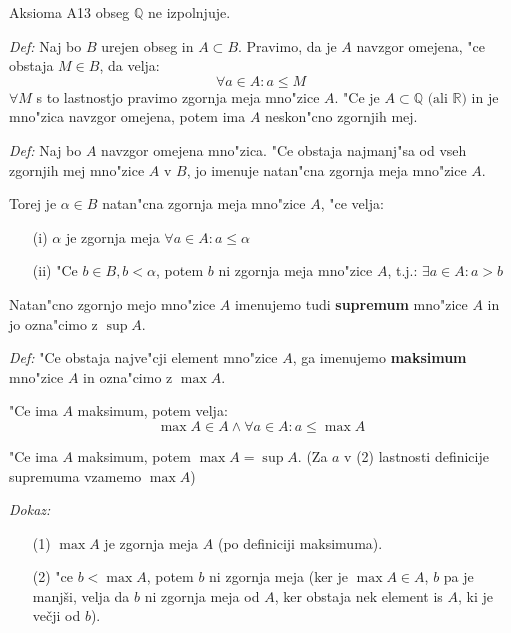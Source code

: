 Aksioma A13 obseg $\mathbb{Q}$ ne izpolnjuje.

\emph{Def:} Naj bo $B$ urejen obseg in $A \subset B$. Pravimo, da je $A$ navzgor omejena, "ce obstaja $M \in B$, da velja:
\[\forall a \in A: a \leq M\]
$\forall M$ s to lastnostjo pravimo zgornja meja mno"zice $A$. "Ce je $A \subset \mathbb{Q} \text{ (ali } \mathbb{R})$ in je mno"zica navzgor omejena, potem ima $A$ neskon"cno zgornjih mej.

\emph{Def:} Naj bo $A$ navzgor omejena mno"zica. "Ce obstaja najmanj"sa od vseh zgornjih mej mno"zice $A$ v $B$, jo imenuje natan"cna zgornja meja mno"zice $A$.

Torej je $\alpha \in B$ natan"cna zgornja meja mno"zice $A$, "ce velja:
\begin{itemize}
	\item[(i)] $\alpha$ je zgornja meja $\forall a \in A: a \leq \alpha$
	\item[(ii)] "Ce $b \in B, b < \alpha$, potem $b$ ni zgornja meja mno"zice $A$, t.j.: $\exists a \in A: a > b$
\end{itemize}
Natan"cno zgornjo mejo mno"zice $A$ imenujemo tudi \textbf{supremum} mno"zice $A$ in jo ozna"cimo z $\sup A$.

\emph{Def:} "Ce obstaja najve"cji element mno"zice $A$, ga imenujemo \textbf{maksimum} mno"zice $A$ in ozna"cimo z $\max A$.

"Ce ima $A$ maksimum, potem velja:
\[\max A \in A \land \forall a \in A: a \leq \max A\]

"Ce ima $A$ maksimum, potem $\max A = \sup A$. (Za $a$ v (2) lastnosti definicije supremuma vzamemo $\max A$)

\emph{Dokaz:}
\begin{itemize}
	\item[(1)] $\max A$ je zgornja meja $A$ (po definiciji maksimuma).
	\item[(2)] "ce $b < \max A$, potem $b$ ni zgornja meja (ker je $\max A \in A$, $b$ pa je manjši, velja da $b$ ni zgornja meja od $A$, ker obstaja nek element is $A$, ki je večji od $b$).
\end{itemize}

